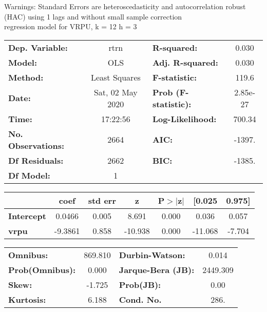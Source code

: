 Warnings: \newline
 [1] Standard Errors are heteroscedasticity and autocorrelation robust (HAC) using 1 lags and without small sample correction\\ 

regression model for VRPU, k = 12 h = 3\begin{center}
\begin{tabular}{lclc}
\toprule
\textbf{Dep. Variable:}    &       rtrn       & \textbf{  R-squared:         } &     0.030   \\
\textbf{Model:}            &       OLS        & \textbf{  Adj. R-squared:    } &     0.030   \\
\textbf{Method:}           &  Least Squares   & \textbf{  F-statistic:       } &     119.6   \\
\textbf{Date:}             & Sat, 02 May 2020 & \textbf{  Prob (F-statistic):} &  2.85e-27   \\
\textbf{Time:}             &     17:22:56     & \textbf{  Log-Likelihood:    } &    700.34   \\
\textbf{No. Observations:} &        2664      & \textbf{  AIC:               } &    -1397.   \\
\textbf{Df Residuals:}     &        2662      & \textbf{  BIC:               } &    -1385.   \\
\textbf{Df Model:}         &           1      & \textbf{                     } &             \\
\bottomrule
\end{tabular}
\begin{tabular}{lcccccc}
                   & \textbf{coef} & \textbf{std err} & \textbf{z} & \textbf{P$> |$z$|$} & \textbf{[0.025} & \textbf{0.975]}  \\
\midrule
\textbf{Intercept} &       0.0466  &        0.005     &     8.691  &         0.000        &        0.036    &        0.057     \\
\textbf{vrpu}      &      -9.3861  &        0.858     &   -10.938  &         0.000        &      -11.068    &       -7.704     \\
\bottomrule
\end{tabular}
\begin{tabular}{lclc}
\textbf{Omnibus:}       & 869.810 & \textbf{  Durbin-Watson:     } &    0.014  \\
\textbf{Prob(Omnibus):} &   0.000 & \textbf{  Jarque-Bera (JB):  } & 2449.309  \\
\textbf{Skew:}          &  -1.725 & \textbf{  Prob(JB):          } &     0.00  \\
\textbf{Kurtosis:}      &   6.188 & \textbf{  Cond. No.          } &     286.  \\
\bottomrule
\end{tabular}
\end{center}

